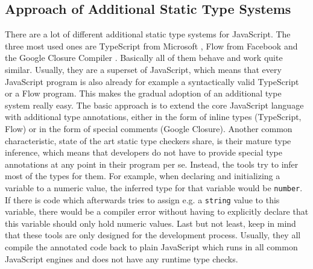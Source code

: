 \documentclass[runningheads,a4paper]{llncs}
\begin{document}
\subsection{Approach of Additional Static Type Systems} \label{staticTypeSystems}
There are a lot of different additional static type systems for JavaScript.
The three most used ones are TypeScript from Microsoft \cite{TypeScript}, Flow from Facebook \cite{Flow} and the Google Closure Compiler \cite{ClosureComiler}.
Basically all of them behave and work quite similar.
Usually, they are a superset of JavaScript, which means that every JavaScript program is also already for example a syntactically valid TypeScript or a Flow program.
This makes the gradual adoption of an additional type system really easy.
The basic approach is to extend the core JavaScript language with additional type annotations, either in the form of inline types (TypeScript, Flow) or in the form of special comments (Google Closure).
Another common characteristic, state of the art static type checkers share, is their mature type inference, which means that developers do not have to provide special type annotations at any point in their program per se.
Instead, the tools try to infer most of the types for them. 
For example, when declaring and initializing a variable to a numeric value, the inferred type for that variable would be \lstinline[columns=fixed]{number}.
If there is code which afterwards tries to assign e.g. a \lstinline[columns=fixed]{string} value to this variable, there would be a compiler error without having to explicitly declare that this variable should only hold numeric values.
Last but not least, keep in mind that these tools are only designed for the development process.
Usually, they all compile the annotated code back to plain JavaScript which runs in all common JavaScript engines and does not have any runtime type checks.
\end{document}
